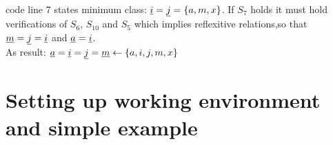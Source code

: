 code line 7 states minimum class: $\underline{i} = \underline{j} = \{a,m,x\}$.
If $S_7$ holds it must hold verifications of $S_{6}$, $S_{10}$ and $S_5$ which implies
reflexitive relations,so that $\underline{m} = \underline{j} = \underline{i}$ and $\underline{a} =
\underline{i}$.
\\
As result: $\underline{a} = \underline{i} = \underline{j} = \underline{m} \gets \{a,i,j,m,x\}$



\section{Setting up working environment and simple example}





